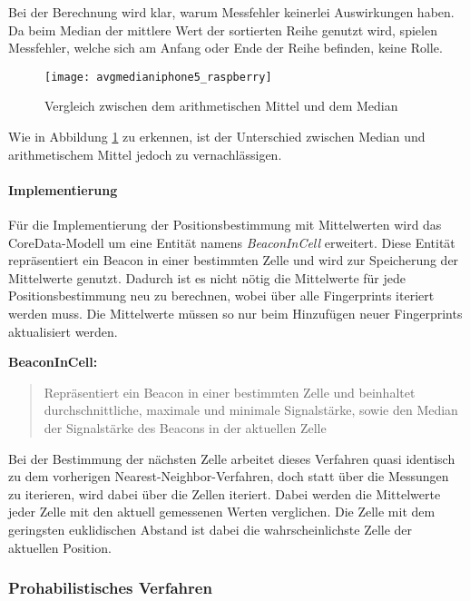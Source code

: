 Bei der Berechnung wird klar, warum Messfehler keinerlei Auswirkungen haben. Da beim Median der mittlere Wert der sortierten Reihe genutzt wird, spielen Messfehler, welche sich am Anfang oder Ende der Reihe befinden, keine Rolle.

\begin{figure}[htb!]
		\centering
	\texttt{[image: avgmedianiphone5\_raspberry]}
	\caption{Vergleich zwischen dem arithmetischen Mittel und dem Median}
	\label{avgmedianiphone5_raspberry}
\end{figure}

Wie in Abbildung \ref{avgmedianiphone5_raspberry} zu erkennen, ist der Unterschied zwischen Median und arithmetischem Mittel jedoch zu vernachlässigen. 

\paragraph{Implementierung}
\label{sec:implementation:fingerprinting:positioning:avg:implementiation}
Für die Implementierung der Positionsbestimmung mit Mittelwerten wird das CoreData-Modell um eine Entität namens \emph{BeaconInCell} erweitert. Diese Entität repräsentiert ein Beacon in einer bestimmten Zelle und wird zur Speicherung der Mittelwerte genutzt. Dadurch ist es nicht nötig die Mittelwerte für jede Positionsbestimmung neu zu berechnen, wobei über alle Fingerprints iteriert werden muss. Die Mittelwerte müssen so nur beim Hinzufügen neuer Fingerprints aktualisiert werden.

\textbf{BeaconInCell:}
	\begin{quote}Repräsentiert ein Beacon in einer bestimmten Zelle und beinhaltet durchschnittliche, maximale und minimale Signalstärke, sowie den Median der Signalstärke des Beacons in der aktuellen Zelle\end{quote}

Bei der Bestimmung der nächsten Zelle arbeitet dieses Verfahren quasi identisch zu dem vorherigen Nearest-Neighbor-Verfahren, doch statt über die Messungen zu iterieren, wird dabei über die Zellen iteriert. Dabei werden die Mittelwerte jeder Zelle mit den aktuell gemessenen Werten verglichen. Die Zelle mit dem geringsten euklidischen Abstand ist dabei die wahrscheinlichste Zelle der aktuellen Position.

\subsubsection{Prohabilistisches Verfahren}
\label{sec:implementation:fingerprinting:positioning:probability}


